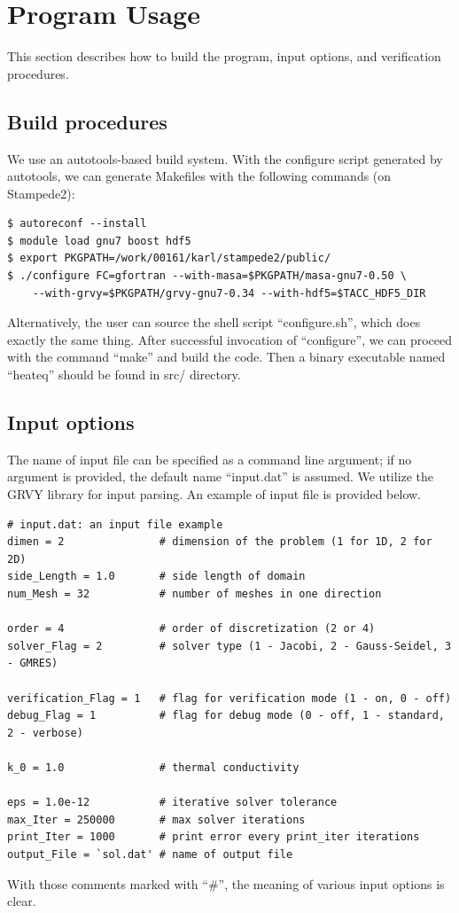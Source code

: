 \documentclass{article}
\begin{document}
\section{Program Usage}
This section describes how to build the program, input options, and verification procedures.

\subsection{Build procedures}
We use an autotools-based build system. With the configure script generated by autotools, we can generate
Makefiles with the following commands (on Stampede2):

\begin{verbatim}
$ autoreconf --install
$ module load gnu7 boost hdf5
$ export PKGPATH=/work/00161/karl/stampede2/public/
$ ./configure FC=gfortran --with-masa=$PKGPATH/masa-gnu7-0.50 \
    --with-grvy=$PKGPATH/grvy-gnu7-0.34 --with-hdf5=$TACC_HDF5_DIR
\end{verbatim}
Alternatively, the user can source the shell script ``configure.sh'', which does exactly the same thing.
After successful invocation of ``configure'', we can proceed with the command ``make'' and build the code.
Then a binary executable named ``heateq'' should be found in src/ directory.

\subsection{Input options}
The name of input file can be specified as a command line argument; if no argument is provided, the
default name ``input.dat'' is assumed. We utilize the GRVY library for input parsing. An example of input file is provided below.

\begin{verbatim}
# input.dat: an input file example
dimen = 2               # dimension of the problem (1 for 1D, 2 for 2D) 
side_Length = 1.0       # side length of domain
num_Mesh = 32           # number of meshes in one direction

order = 4               # order of discretization (2 or 4)
solver_Flag = 2         # solver type (1 - Jacobi, 2 - Gauss-Seidel, 3 - GMRES)

verification_Flag = 1   # flag for verification mode (1 - on, 0 - off)
debug_Flag = 1          # flag for debug mode (0 - off, 1 - standard, 2 - verbose)

k_0 = 1.0               # thermal conductivity

eps = 1.0e-12           # iterative solver tolerance
max_Iter = 250000       # max solver iterations
print_Iter = 1000       # print error every print_iter iterations
output_File = `sol.dat' # name of output file
\end{verbatim}
With those comments marked with ``\#'', the meaning of various input options is clear.
\end{document}
